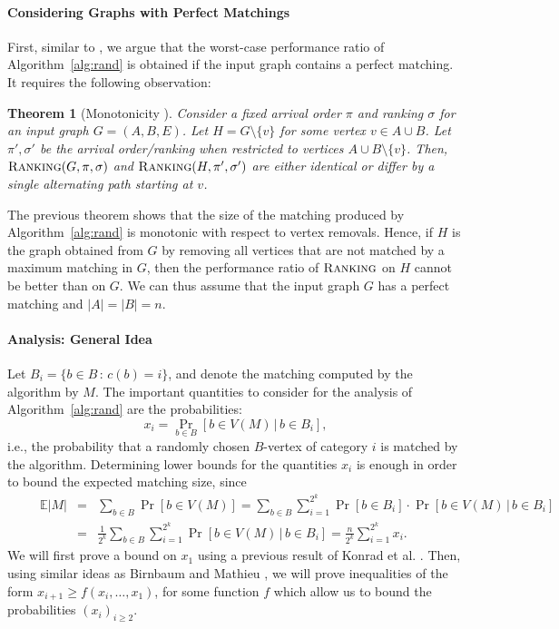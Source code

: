 \documentclass[a4paper]{article}
\newcommand{\Exp}{\mathbb{E}}
\newcommand{\Rank}{\textsc{Ranking}}
\newtheorem{theorem}{Theorem}
\begin{document}
\paragraph*{Considering Graphs with Perfect Matchings}
First, similar to \cite{bm08}, we argue that the worst-case performance ratio of Algorithm~\ref{alg:rand} is obtained
if the input graph contains a perfect matching. It requires the following observation:

\begin{theorem}[Monotonicity \cite{gm08,kvv90}]
 Consider a fixed arrival order $\pi$ and ranking $\sigma$ for an input graph $G=(A, B, E)$.
 Let $H = G \setminus \{v \}$ for some vertex $v \in A \cup B$. Let $\pi', \sigma'$ be the arrival order/ranking
 when restricted to vertices $A \cup B \setminus \{v \}$. Then, $\Rank(G, \pi, \sigma)$ and $\Rank(H, \pi', \sigma')$
 are either identical or differ by a single alternating path starting at $v$.
\end{theorem}
The previous theorem shows that the size of the matching produced by Algorithm~\ref{alg:rand} is monotonic
with respect to vertex removals. Hence, if $H$ is the graph obtained from $G$ by removing all vertices that are
not matched by a maximum matching in $G$, then the performance ratio of $\Rank$ on $H$ cannot be better than on $G$.
We can thus assume that the input graph $G$ has a perfect matching and $|A| = |B| = n$.


\paragraph*{Analysis: General Idea}
Let $B_i = \{ b \in B \, : \, c(b) = i \}$, and denote the matching computed by the algorithm by $M$.
The important quantities to consider for the analysis of Algorithm~\ref{alg:rand} are the probabilities:
$$x_i = \Pr_{b \in B} \left[ b \in V(M)  \, | \, b \in B_i \right],$$
i.e., the probability that a randomly chosen $B$-vertex of category $i$ is matched by the algorithm. Determining
lower bounds for the quantities $x_i$ is enough in order to bound the expected matching size, since
\begin{eqnarray}
\nonumber \, \quad \quad \Exp |M| & = & \sum_{b \in B} \Pr \left[ b \in V(M) \right] = \sum_{b \in B} \sum_{i=1}^{2^k}
\Pr \left[b \in B_i \right] \cdot \Pr \left[ b \in V(M) \, | \, b \in B_i \right] \\
& = & \frac{1}{2^k} \sum_{b \in B} \sum_{i=1}^{2^k} \Pr \left[ b \in V(M) \, | \, b \in B_i \right]
= \frac{n}{2^k} \sum_{i=1}^{2^k} x_i . \label{eqn:299}
\end{eqnarray}
We will first prove a bound on $x_1$ using a previous result of Konrad et al. \cite{kmm12}.
Then, using similar ideas as Birnbaum and Mathieu \cite{bm08}, we will prove inequalities of the form
$x_{i+1} \ge f(x_i, \dots, x_1)$, for some function $f$ which allow us to bound the probabilities
$(x_i)_{i \ge 2}$.
\end{document}
